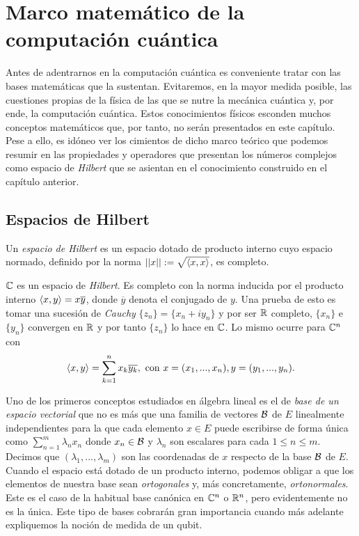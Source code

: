 \chapter{Marco matemático de la computación cuántica}

Antes de adentrarnos en la computación cuántica es conveniente tratar con las bases matemáticas que la sustentan. Evitaremos, en la mayor medida posible, las cuestiones propias de la física de las que se nutre la mecánica cuántica y, por ende, la computación cuántica. Estos conocimientos físicos esconden muchos conceptos matemáticos que, por tanto, no serán presentados en este capítulo. Pese a ello, es idóneo ver los cimientos de dicho marco teórico que podemos resumir en las propiedades y operadores que presentan los números complejos como espacio de \textit{Hilbert} que se asientan en el conocimiento construido en el capítulo anterior.

\section{Espacios de Hilbert}
\begin{definition} Un \textit{espacio de Hilbert} es un espacio dotado de producto interno cuyo espacio normado, definido por la norma $\left|\left|x\right|\right|:=\sqrt{\langle x,x\rangle}$, es completo.
\end{definition}

\begin{example} \label{ex:ex32} $\mathbb{C}$ es un espacio de \textit{Hilbert}. Es completo con la norma inducida por el producto interno $\langle x,y\rangle=x\overline{y}$, donde $\overline{y}$ denota el conjugado de $y$. Una prueba de esto es tomar una sucesión de \textit{Cauchy} $\{z_n\}=\{x_n+iy_n\}$ y por ser $\mathbb{R}$ completo, $\{x_n\}$ e $\{y_n\}$ convergen en $\mathbb{R}$ y por tanto $\{z_n\}$ lo hace en $\mathbb{C}$. Lo mismo ocurre para $\mathbb{C}^n$ con
$$\dotproduct{x}{y}=\sum^{n}_{k=1}x_k\overline{y_k},\mathrm{\ con\ } x=(x_1,...,x_n), y=(y_1,...,y_n).
$$\end{example}

Uno de los primeros conceptos estudiados en álgebra lineal es el de {\it base de un espacio vectorial} que no es más que una familia de vectores $\mathcal{B}$ de $E$ linealmente independientes para la que cada elemento $x\in E$ puede escribirse de forma única como $\sum_{n=1}^m\lambda_nx_n$ donde $x_n\in\mathcal{B}$ y $\lambda_n$ son escalares para cada $1\leq n\leq m$. Decimos que $(\lambda_1,...,\lambda_m)$ son las coordenadas de $x$ respecto de la base $\mathcal{B}$ de $E$. Cuando el espacio está dotado de un producto interno, podemos obligar a que los elementos de nuestra base sean {\it ortogonales} y, más concretamente, {\it ortonormales}. Este es el caso de la habitual base canónica en $\mathbb{C}^n$ o $\mathbb{R}^n$, pero evidentemente no es la única. Este tipo de bases cobrarán gran importancia cuando más adelante expliquemos la noción de medida de un qubit.

